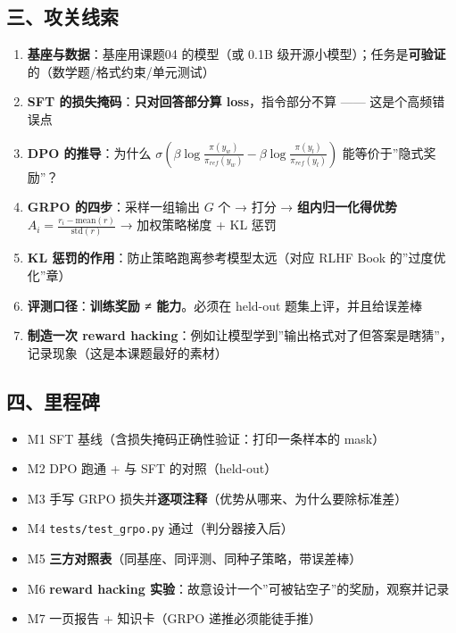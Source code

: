 \documentclass[
  chinese,
  11pt,
]{ctexart}
\providecommand{\tightlist}{%
  \setlength{\itemsep}{0pt}\setlength{\parskip}{0pt}}
\begin{document}
\subsection{三、攻关线索}\label{ux4e09ux653bux5173ux7ebfux7d22}

\begin{enumerate}
\def\labelenumi{\arabic{enumi}.}
\tightlist
\item
  \textbf{基座与数据}：基座用课题04 的模型（或 0.1B 级开源小模型）；任务是\textbf{可验证}的（数学题/格式约束/单元测试）
\item
  \textbf{SFT 的损失掩码}：\textbf{只对回答部分算 loss}，指令部分不算 ------ 这是个高频错误点
\item
  \textbf{DPO 的推导}：为什么 \(\sigma(\beta \log\frac{\pi(y_w)}{\pi_{ref}(y_w)} - \beta\log\frac{\pi(y_l)}{\pi_{ref}(y_l)})\) 能等价于''隐式奖励''？
\item
  \textbf{GRPO 的四步}：采样一组输出 \(G\) 个 → 打分 → \textbf{组内归一化得优势} \(A_i = \frac{r_i - \mathrm{mean}(r)}{\mathrm{std}(r)}\) → 加权策略梯度 + KL 惩罚
\item
  \textbf{KL 惩罚的作用}：防止策略跑离参考模型太远（对应 RLHF Book 的''过度优化''章）
\item
  \textbf{评测口径}：\textbf{训练奖励 ≠ 能力}。必须在 held-out 题集上评，并且给误差棒
\item
  \textbf{制造一次 reward hacking}：例如让模型学到''输出格式对了但答案是瞎猜''，记录现象（这是本课题最好的素材）
\end{enumerate}

\subsection{四、里程碑}\label{ux56dbux91ccux7a0bux7891}

\begin{itemize}
\tightlist
\item[$\square$]
  M1 SFT 基线（含损失掩码正确性验证：打印一条样本的 mask）
\item[$\square$]
  M2 DPO 跑通 + 与 SFT 的对照（held-out）
\item[$\square$]
  M3 手写 GRPO 损失并\textbf{逐项注释}（优势从哪来、为什么要除标准差）
\item[$\square$]
  M4 \texttt{tests/test\_grpo.py} 通过（判分器接入后）
\item[$\square$]
  M5 \textbf{三方对照表}（同基座、同评测、同种子策略，带误差棒）
\item[$\square$]
  M6 \textbf{reward hacking 实验}：故意设计一个''可被钻空子''的奖励，观察并记录
\item[$\square$]
  M7 一页报告 + 知识卡（GRPO 递推必须能徒手推）
\end{itemize}
\end{document}
